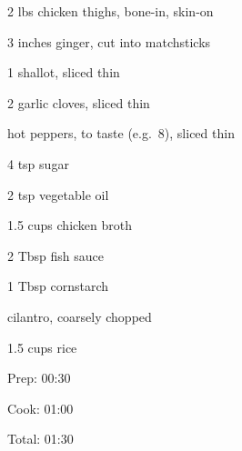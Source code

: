 \documentclass[oneside]{book}  %
\newcommand{\itemNL}{\item[] \hspace{-\labelsep}}  %
\begin{document}
\begin{IT}
  \begin{ingredients}
    \item[2 lbs] chicken thighs, bone-in, skin-on
    \item[3 inches] ginger, cut into matchsticks
    \item[1] shallot, sliced thin
    \item[2] garlic cloves, sliced thin
    \itemNL hot peppers, to taste (e.g.\ 8), sliced thin
    \item[4 tsp] sugar
    \item[2 tsp] vegetable oil
    \item[1.5 cups] chicken broth
    \item[2 Tbsp] fish sauce
    \item[1 Tbsp] cornstarch
    \itemNL cilantro, coarsely chopped
    \item[1.5 cups] rice
  \end{ingredients}

  \switchcolumn

  \begin{timeline}
    \item[Prep:]  00:30
    \item[Cook:]  01:00
    \item[Total:] 01:30
  \end{timeline}
\end{IT}
\end{document}

